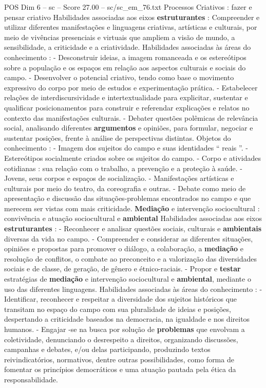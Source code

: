 \begin{textsample}{POS Dim 6 – sc – Score 27.00 – sc/sc\_em\_76.txt}
Processos Criativos : fazer e pensar criativo Habilidades associadas aos eixos \textbf{estruturantes} : Compreender e utilizar diferentes manifestações e linguagens criativas, artísticas e culturais, por meio de vivências presenciais e virtuais que ampliem a visão de mundo, a sensibilidade, a criticidade e a criatividade.
Habilidades associadas às áreas do conhecimento : - Desconstruir ideias, a imagem romanceada e os estereótipos sobre a população e os espaços em relação aos aspectos culturais e sociais do campo. - Desenvolver o potencial criativo, tendo como base o movimento expressivo do corpo por meio de estudos e experimentação prática. - Estabelecer relações de interdiscursividade e intertextualidade para explicitar, sustentar e qualificar posicionamentos para construir e referendar explicações e relatos no contexto das manifestações culturais. - Debater questões polêmicas de relevância social, analisando diferentes \textbf{argumentos} e opiniões, para formular, negociar e sustentar posições, frente à análise de perspectivas distintas.
Objetos do conhecimento : - Imagem dos sujeitos do campo e suas identidades “ reais ”. - Estereótipos socialmente criados sobre os sujeitos do campo. - Corpo e atividades cotidianas : sua relação com o trabalho, a prevenção e a proteção à saúde. - Jovens, seus corpos e espaços de socialização. - Manifestações artísticas e culturais por meio do teatro, da coreografia e outras. - Debate como meio de apresentação e discussão das situações-problemas encontrados no campo e que merecem ser vistas com mais criticidade. \textbf{Mediação} e intervenção sociocultural : convivência e atuação sociocultural e \textbf{ambiental} Habilidades associadas aos eixos \textbf{estruturantes} : - Reconhecer e analisar questões sociais, culturais e \textbf{ambientais} diversas da vida no campo. - Compreender e considerar as diferentes situações, opiniões e propostas para promover o diálogo, a colaboração, a \textbf{mediação} e resolução de conflitos, o combate ao preconceito e a valorização das diversidades sociais e de classe, de geração, de gênero e étnico-raciais. - Propor e \textbf{testar} estratégias de \textbf{mediação} e intervenção sociocultural e \textbf{ambiental}, mediante o uso das diferentes linguagens.
Habilidades associadas às áreas do conhecimento : - Identificar, reconhecer e respeitar a diversidade dos sujeitos históricos que transitam no espaço do campo com sua pluralidade de ideias e posições, despertando a criticidade baseados na democracia, na igualdade e nos direitos humanos. - Engajar -se na busca por solução de \textbf{problemas} que envolvam a coletividade, denunciando o desrespeito a direitos, organizando discussões, campanhas e debates, e/ou delas participando, produzindo textos reivindicatórios, normativos, dentre outras possibilidades, como forma de fomentar os princípios democráticos e uma atuação pautada pela ética da responsabilidade.

\end{textsample}
